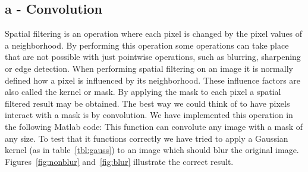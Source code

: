 \subsection*{a - Convolution}
Spatial filtering is an operation where each pixel is changed by the pixel values of a neighborhood. By performing this operation some operations can take place that are not possible with just pointwise operations, such as blurring, sharpening or edge detection. When performing spatial filtering on an image it is normally defined how a pixel is influenced by its neighborhood. These influence factors are also called the kernel or mask. By applying the mask to each pixel a spatial filtered result may be obtained. The best way we could think of to have pixels interact with a mask is by convolution. We have implemented this operation in the following Matlab code: 
This function can convolute any image with a mask of any size. To test that it functions correctly we have tried to apply a Gaussian kernel (as in table~\ref{tbl:gauss}) to an image which should blur the original image. Figures~\ref{fig:nonblur} and~\ref{fig:blur} illustrate the correct result.
